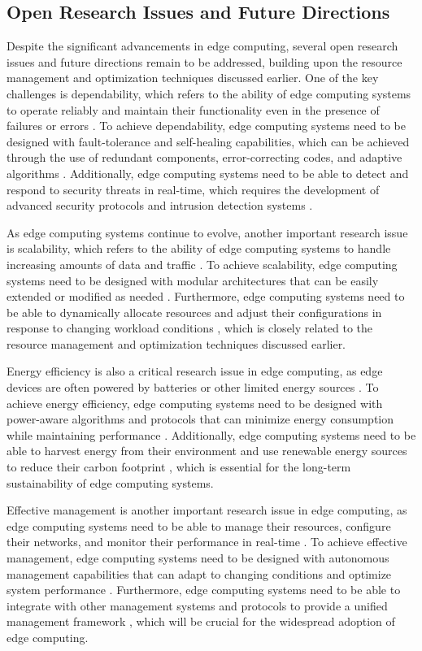 \documentclass[11pt]{article}
\begin{document}
\subsection{Open Research Issues and Future Directions}

Despite the significant advancements in edge computing, several open research issues and future directions remain to be addressed, building upon the resource management and optimization techniques discussed earlier. One of the key challenges is dependability, which refers to the ability of edge computing systems to operate reliably and maintain their functionality even in the presence of failures or errors \cite{ref5}. To achieve dependability, edge computing systems need to be designed with fault-tolerance and self-healing capabilities, which can be achieved through the use of redundant components, error-correcting codes, and adaptive algorithms \cite{ref77}. Additionally, edge computing systems need to be able to detect and respond to security threats in real-time, which requires the development of advanced security protocols and intrusion detection systems \cite{ref78}.

As edge computing systems continue to evolve, another important research issue is scalability, which refers to the ability of edge computing systems to handle increasing amounts of data and traffic \cite{ref12}. To achieve scalability, edge computing systems need to be designed with modular architectures that can be easily extended or modified as needed \cite{ref79}. Furthermore, edge computing systems need to be able to dynamically allocate resources and adjust their configurations in response to changing workload conditions \cite{ref49}, which is closely related to the resource management and optimization techniques discussed earlier.

Energy efficiency is also a critical research issue in edge computing, as edge devices are often powered by batteries or other limited energy sources \cite{ref80}. To achieve energy efficiency, edge computing systems need to be designed with power-aware algorithms and protocols that can minimize energy consumption while maintaining performance \cite{ref81}. Additionally, edge computing systems need to be able to harvest energy from their environment and use renewable energy sources to reduce their carbon footprint \cite{ref51}, which is essential for the long-term sustainability of edge computing systems.

Effective management is another important research issue in edge computing, as edge computing systems need to be able to manage their resources, configure their networks, and monitor their performance in real-time \cite{ref82}. To achieve effective management, edge computing systems need to be designed with autonomous management capabilities that can adapt to changing conditions and optimize system performance \cite{ref77}. Furthermore, edge computing systems need to be able to integrate with other management systems and protocols to provide a unified management framework \cite{ref39}, which will be crucial for the widespread adoption of edge computing.
\end{document}
